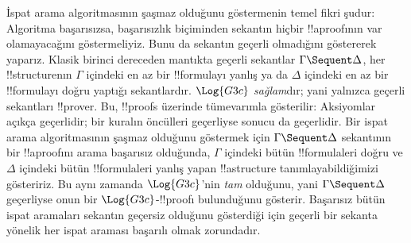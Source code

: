 \documentclass[../../../include/open-logic-section]{subfiles}
\begin{document}
İspat arama algoritmasının şaşmaz olduğunu göstermenin temel fikri şudur:
Algoritma başarısızsa, başarısızlık biçiminden sekantın hiçbir !!a{proof}{}ının
var olamayacağını göstermeliyiz. Bunu da sekantın geçerli olmadığını göstererek
yaparız. Klasik birinci dereceden mantıkta geçerli sekantlar
$\Gamma \Sequent \Delta$, her !!{structure}{}nın $\Gamma$ içindeki en az bir
!!{formula}{}yı yanlış ya da $\Delta$ içindeki en az bir !!{formula}{}yı doğru
yaptığı sekantlardır. $\Log{G3c}$ \emph{sağlam}dır; yani yalnızca geçerli
sekantları !!{prove}{}r. Bu, !!{proof}s üzerinde tümevarımla gösterilir:
Aksiyomlar açıkça geçerlidir; bir kuralın öncülleri geçerliyse sonucu da
geçerlidir. Bir ispat arama algoritmasının şaşmaz olduğunu göstermek için
$\Gamma \Sequent \Delta$ sekantının bir !!a{proof}{}ını arama başarısız olduğunda,
$\Gamma$ içindeki bütün !!{formula}{}leri doğru ve $\Delta$ içindeki bütün
!!{formula}{}leri yanlış yapan !!a{structure} tanımlayabildiğimizi gösteririz.
Bu aynı zamanda $\Log{G3c}$'nin \emph{tam} olduğunu, yani
$\Gamma \Sequent \Delta$ geçerliyse onun bir $\Log{G3c}$-!!{proof}{}ı
bulunduğunu gösterir. Başarısız bütün ispat aramaları sekantın geçersiz
olduğunu gösterdiği için geçerli bir sekanta yönelik her ispat araması
başarılı olmak zorundadır.
\end{document}
